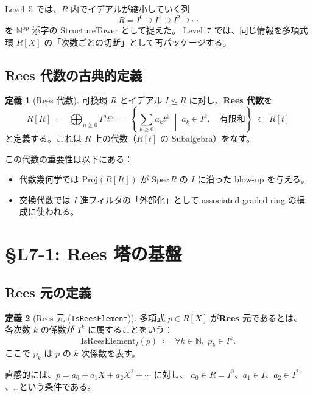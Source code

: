 \documentclass[a4paper,12pt]{article}
\theoremstyle{definition}
\newtheorem{definition}{定義}[section]
\theoremstyle{plain}
\newcommand{\Ipower}[1]{I^{#1}}
\newcommand{\IsRees}{\mathrm{IsReesElement}}
\begin{document}
\medskip
Level~5 では、$R$ 内でイデアルが縮小していく列
\[
  R = \Ipower{0} \supseteq \Ipower{1} \supseteq \Ipower{2} \supseteq \cdots
\]
を $\mathbb{N}^{\mathrm{op}}$ 添字の StructureTower として捉えた。
Level~7 では、同じ情報を多項式環 $R[X]$ の「次数ごとの切断」として再パッケージする。

\subsection{Rees 代数の古典的定義}

\begin{definition}[Rees 代数]
可換環 $R$ とイデアル $I \trianglelefteq R$ に対し、\textbf{Rees 代数}を
\[
  R[It] \;\coloneqq\; \bigoplus_{n \geq 0} \Ipower{n} t^n
  \;=\; \left\{ \sum_{k \geq 0} a_k t^k \;\middle|\; a_k \in \Ipower{k},\quad \text{有限和} \right\}
  \;\subset\; R[t]
\]
と定義する。これは $R$ 上の代数（$R[t]$ の Subalgebra）をなす。
\end{definition}

この代数の重要性は以下にある：
\begin{itemize}[noitemsep]
  \item 代数幾何学では $\mathrm{Proj}(R[It])$ が
        $\mathrm{Spec}\,R$ の $I$ に沿った blow-up を与える。
  \item 交換代数では $I$-進フィルタの「外部化」として
        associated graded ring の構成に使われる。
\end{itemize}

\section{\S{}L7-1: Rees 塔の基盤}

\subsection{Rees 元の定義}

\begin{definition}[Rees 元 (\texttt{IsReesElement})]
多項式 $p \in R[X]$ が\textbf{Rees 元}であるとは、
各次数 $k$ の係数が $\Ipower{k}$ に属することをいう：
\[
  \IsRees_I(p) \;\coloneqq\; \forall k \in \mathbb{N},\; p_k \in \Ipower{k}.
\]
ここで $p_k$ は $p$ の $k$ 次係数を表す。
\end{definition}

直感的には、$p = a_0 + a_1 X + a_2 X^2 + \cdots$ に対し、
$a_0 \in R = I^0$、$a_1 \in I$、$a_2 \in I^2$、\ldots{}という条件である。
\end{document}
